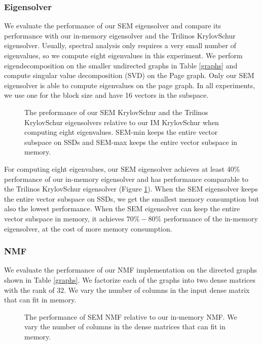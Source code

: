 \subsubsection{Eigensolver}

We evaluate the performance of our SEM eigensolver and compare its performance
with our in-memory eigensolver and the Trilinos KrylovSchur eigensolver.
Usually, spectral analysis \cite{} only requires a very small number of
eigenvalues, so we compute eight eigenvalues in this experiment. We perform
eigendecomposition on the smaller undirected graphs
in Table \ref{graphs} and compute singular value decomposition (SVD) on
the Page graph. Only our SEM eigensolver is able to compute eigenvalues
on the page graph. In all experiments, we use one for the block size and
have 16 vectors in the subspace.

\begin{figure}
	\begin{center}
		\footnotesize
		
		\caption{The preformance of our SEM KrylovSchur and the Trilinos KrylovSchur
			eigensolvers relative to our IM KrylovSchur when computing eight
			eigenvalues. SEM-min keeps the entire vector subspace on SSDs and
		SEM-max keeps the entire vector subspace in memory.}
		\label{fig:eigen}
	\end{center}
\end{figure}

For computing eight eigenvalues, our SEM eigensolver achieves at least 40\%
performance of our in-memory eigensolver and has performance comparable to
the Trilinos KrylovSchur eigensolver (Figure \ref{fig:eigen}). When the SEM
eigensolver keeps the entire vector subspace on SSDs, we get the smallest
memory consumption but also the lowest performance. When the SEM eigensolver
can keep the entire vector subspace in memory, it achieves $70\%-80\%$
performance of the in-memory eigensolver, at the cost of more memory consumption.

\subsubsection{NMF}
We evaluate the performance of our NMF implementation on the directed graphs
shown in Table \ref{graphs}. We factorize each of the graphs into two dense
matrices with the rank of 32. We vary the number of columns in the input dense
matrix that can fit in memory.

\begin{figure}
	\begin{center}
		\footnotesize
		
		\caption{The performance of SEM NMF relative to our in-memory NMF.
			We vary the number of columns in the dense matrices that can fit
		in memory.}
		\label{perf:NMF}
	\end{center}
\end{figure}
